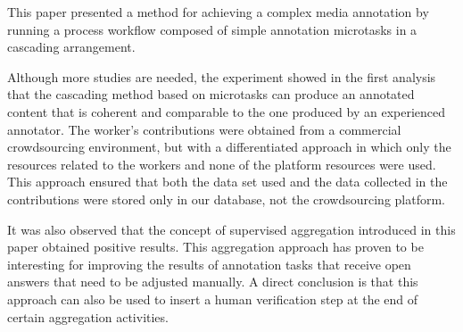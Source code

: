 
This paper presented a method for achieving a complex media annotation by running a process workflow composed of simple annotation microtasks in a cascading arrangement. 




Although more studies are needed, the experiment showed in the first analysis that the cascading method based on microtasks can produce an annotated content that is coherent and comparable to the one produced by an experienced annotator. The worker's contributions were obtained from a commercial crowdsourcing environment, but with a differentiated approach in which only the resources related to the workers and none of the platform resources were used. This approach ensured that both the data set used and the data collected in the contributions were stored only in our database, not the crowdsourcing platform.


It was also observed that the concept of supervised aggregation introduced in this paper obtained positive results. This aggregation approach has proven to be interesting for improving the results of annotation tasks that receive open answers that need to be adjusted manually. A direct conclusion is that this approach can also be used to insert a human verification step at the end of certain aggregation activities.




